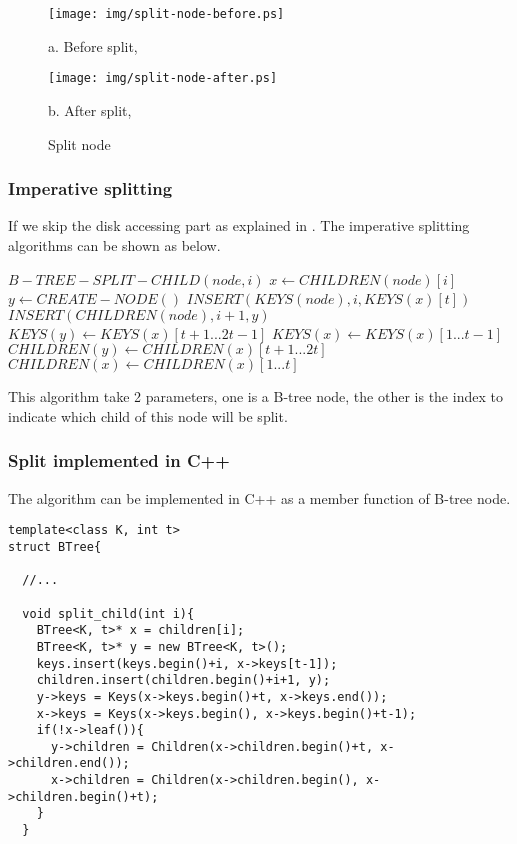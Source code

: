 \documentclass{article}
\begin{document}
\begin{figure}[htbp]
       \begin{center}
       	  \texttt{[image: img/split-node-before.ps]}

          a. Before split,

          \texttt{[image: img/split-node-after.ps]}

          b. After split, 
        \caption{Split node} \label{fig:node-split}
       \end{center}
\end{figure}

\subsubsection{Imperative splitting}
If we skip the disk accessing part as explained in \cite{CLRS}. The 
imperative splitting algorithms can be shown as below.

\begin{algorithmic}
\STATE $B-TREE-SPLIT-CHILD(node, i)$
  \STATE $x \leftarrow CHILDREN(node)[i]$
  \STATE $y \leftarrow CREATE-NODE()$
  \STATE $INSERT(KEYS(node), i, KEYS(x)[t])$
  \STATE $INSERT(CHILDREN(node), i+1, y)$
  \STATE $KEYS(y) \leftarrow KEYS(x)[t+1 ... 2t-1]$
  \STATE $KEYS(x) \leftarrow KEYS(x)[1 ... t-1]$
    \STATE $CHILDREN(y) \leftarrow CHILDREN(x)[t+1 ... 2t]$
    \STATE $CHILDREN(x) \leftarrow CHILDREN(x)[1 ... t]$
  \ENDIF
\end{algorithmic}

This algorithm take 2 parameters, one is a B-tree node, the other
is the index to indicate which child of this node will be split.

\subsubsection*{Split implemented in C++}
The algorithm can be implemented in C++ as a member function of
B-tree node.

\lstset{language=C++}
\begin{lstlisting}
template<class K, int t>
struct BTree{

  //...

  void split_child(int i){
    BTree<K, t>* x = children[i];
    BTree<K, t>* y = new BTree<K, t>();
    keys.insert(keys.begin()+i, x->keys[t-1]);
    children.insert(children.begin()+i+1, y);
    y->keys = Keys(x->keys.begin()+t, x->keys.end());
    x->keys = Keys(x->keys.begin(), x->keys.begin()+t-1);
    if(!x->leaf()){
      y->children = Children(x->children.begin()+t, x->children.end());
      x->children = Children(x->children.begin(), x->children.begin()+t);
    }
  }
\end{lstlisting}
\end{document}
